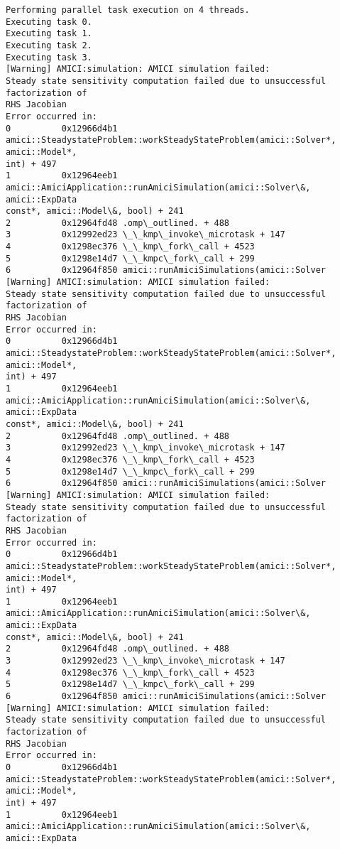\documentclass[11pt]{article}
\begin{document}
    \begin{Verbatim}[commandchars=\\\{\}]
Performing parallel task execution on 4 threads.
Executing task 0.
Executing task 1.
Executing task 2.
Executing task 3.
[Warning] AMICI:simulation: AMICI simulation failed:
Steady state sensitivity computation failed due to unsuccessful factorization of
RHS Jacobian
Error occurred in:
0          0x12966d4b1
amici::SteadystateProblem::workSteadyStateProblem(amici::Solver*, amici::Model*,
int) + 497
1          0x12964eeb1
amici::AmiciApplication::runAmiciSimulation(amici::Solver\&, amici::ExpData
const*, amici::Model\&, bool) + 241
2          0x12964fd48 .omp\_outlined. + 488
3          0x12992ed23 \_\_kmp\_invoke\_microtask + 147
4          0x1298ec376 \_\_kmp\_fork\_call + 4523
5          0x1298e14d7 \_\_kmpc\_fork\_call + 299
6          0x12964f850 amici::runAmiciSimulations(amici::Solver
[Warning] AMICI:simulation: AMICI simulation failed:
Steady state sensitivity computation failed due to unsuccessful factorization of
RHS Jacobian
Error occurred in:
0          0x12966d4b1
amici::SteadystateProblem::workSteadyStateProblem(amici::Solver*, amici::Model*,
int) + 497
1          0x12964eeb1
amici::AmiciApplication::runAmiciSimulation(amici::Solver\&, amici::ExpData
const*, amici::Model\&, bool) + 241
2          0x12964fd48 .omp\_outlined. + 488
3          0x12992ed23 \_\_kmp\_invoke\_microtask + 147
4          0x1298ec376 \_\_kmp\_fork\_call + 4523
5          0x1298e14d7 \_\_kmpc\_fork\_call + 299
6          0x12964f850 amici::runAmiciSimulations(amici::Solver
[Warning] AMICI:simulation: AMICI simulation failed:
Steady state sensitivity computation failed due to unsuccessful factorization of
RHS Jacobian
Error occurred in:
0          0x12966d4b1
amici::SteadystateProblem::workSteadyStateProblem(amici::Solver*, amici::Model*,
int) + 497
1          0x12964eeb1
amici::AmiciApplication::runAmiciSimulation(amici::Solver\&, amici::ExpData
const*, amici::Model\&, bool) + 241
2          0x12964fd48 .omp\_outlined. + 488
3          0x12992ed23 \_\_kmp\_invoke\_microtask + 147
4          0x1298ec376 \_\_kmp\_fork\_call + 4523
5          0x1298e14d7 \_\_kmpc\_fork\_call + 299
6          0x12964f850 amici::runAmiciSimulations(amici::Solver
[Warning] AMICI:simulation: AMICI simulation failed:
Steady state sensitivity computation failed due to unsuccessful factorization of
RHS Jacobian
Error occurred in:
0          0x12966d4b1
amici::SteadystateProblem::workSteadyStateProblem(amici::Solver*, amici::Model*,
int) + 497
1          0x12964eeb1
amici::AmiciApplication::runAmiciSimulation(amici::Solver\&, amici::ExpData

\end{Verbatim}
\end{document}
